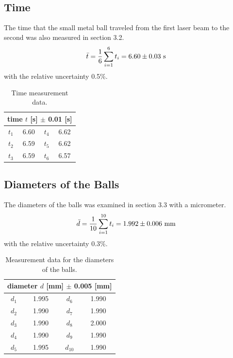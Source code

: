 \documentclass[a4paper]{report}
\begin{document}
	\subsection{Time}
	The time that the small metal ball traveled from the first laser beam to the second was also measured in section 3.2.
	\begin{equation*}
	\bar{t}=\dfrac{1}{6}\sum_{i=1}^{6}t_i=6.60\pm0.03\ \rm{s}
	\end{equation*}
	with the relative uncertainty 0.5\%.
	\begin{table}[H]
		\centering
		\begin{tabular}{|c|c|c|c|}
			\hline
			\multicolumn{4}{|c|}{time $t$ [s] $\pm$ 0.01 [s]}\\
			\hline
			$t_1$&6.60&$t_4$&6.62\\
			\hline
			$t_2$&6.59&$t_5$&6.62\\
			\hline
			$t_3$&6.59&$t_6$&6.57\\
			\hline
		\end{tabular}
		\caption{Time measurement data.}
	\end{table}
	\subsection{Diameters of the Balls}
	The diameters of the balls was examined in section 3.3 with a micrometer.
	\begin{equation*}
	\bar{d}=\dfrac{1}{10}\sum_{i=1}^{10}t_i=1.992\pm0.006\ \rm{mm}
	\end{equation*}
	with the relative uncertainty 0.3\%.
	\begin{table}[H]
		\centering
		\begin{tabular}{|c|c|c|c|}
			\hline
			\multicolumn{4}{|c|}{diameter $d$ [mm] $\pm$ 0.005 [mm]}\\
			\hline
			$d_1$&1.995&$d_6$&1.990\\
			\hline
			$d_2$&1.990&$d_7$&1.990\\
			\hline
			$d_3$&1.990&$d_8$&2.000\\
			\hline
			$d_4$&1.990&$d_9$&1.990\\
			\hline
			$d_5$&1.995&$d_{10}$&1.990\\
			\hline
		\end{tabular}
		\caption{Measurement data for the diameters of the balls.}
	\end{table}
\end{document}
